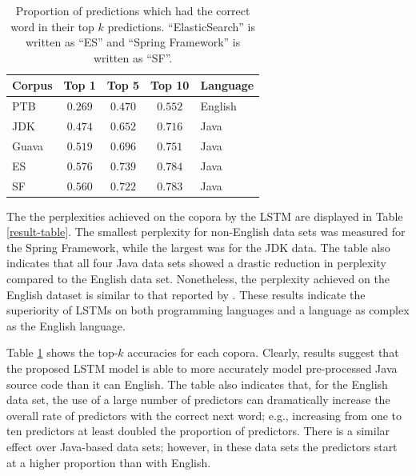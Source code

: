 \documentclass[runningheads,a4paper]{llncs}
\begin{document}
\begin{table}[t]
    \caption{Proportion of predictions which had the correct
    word in their top $k$ predictions.
    ``ElasticSearch'' is written as ``ES'' and ``Spring
    Framework'' is written as ``SF''.}
    \label{topk-table}
    \vskip 0.15in
    \begin{center}
    \begin{tabular}{lcccl}
    \hline
    Corpus & Top 1 & Top 5 & Top 10 & Language \\
    \hline
    PTB                 & $0.269$ & $0.470$ & $0.552$ & English \\
    JDK                 & $0.474$ & $0.652$ & $0.716$ & Java \\
    Guava               & $0.519$ & $0.696$ & $0.751$ & Java \\
    ES       & $0.576$ & $0.739$ & $0.784$ & Java \\
    SF    & $0.560$ & $0.722$ & $0.783$ & Java \\
    \hline
    \end{tabular}
    \end{center}
    \vskip -0.1in
\end{table}

The the perplexities achieved on the copora by the LSTM are displayed in
Table \ref{result-table}. The smallest perplexity for non-English data sets 
was measured for the Spring Framework, while the largest was for the JDK data. 
The table also indicates that all four Java data sets showed a drastic 
reduction in perplexity compared to the English data set. Nonetheless, the 
perplexity achieved on the English dataset is similar to that reported by 
\citet{LSTMArticle}. These results indicate the superiority of LSTMs on both
programming languages and a language as complex as the English language.

Table \ref{topk-table} shows the top-$k$ accuracies for each copora.
Clearly, results suggest that the proposed LSTM model is able to more
accurately model pre-processed Java source code than it can English. The table
also indicates that, for the English data set, the use of a large number of
predictors can dramatically increase the overall rate of predictors with the
correct next word; e.g., increasing from one to ten predictors at least doubled
the proportion of predictors. There is a similar effect over Java-based data
sets; however, in these data sets the predictors start at a higher proportion
than with English.
\end{document}
